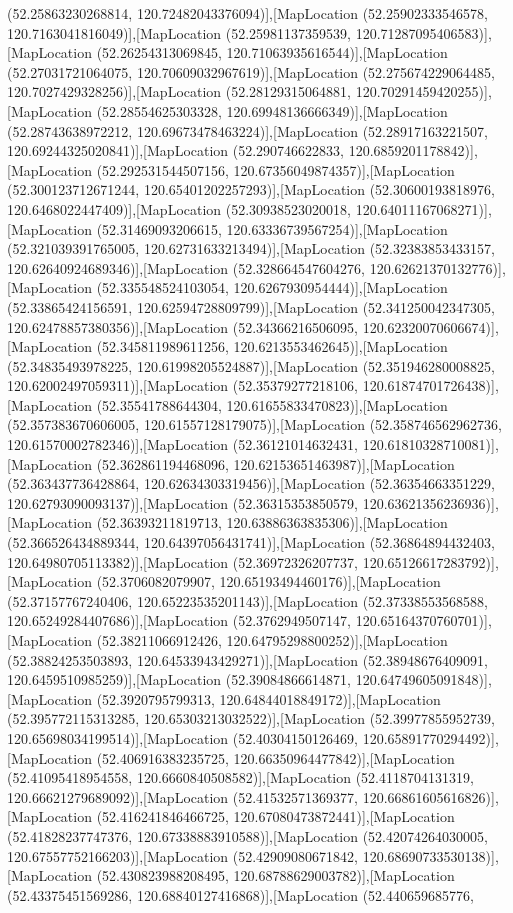(52.25863230268814, 120.72482043376094)],[MapLocation (52.25902333546578, 120.7163041816049)],[MapLocation (52.25981137359539, 120.71287095406583)],[MapLocation (52.26254313069845, 120.71063935616544)],[MapLocation (52.27031721064075, 120.70609032967619)],[MapLocation (52.275674229064485, 120.7027429328256)],[MapLocation (52.28129315064881, 120.70291459420255)],[MapLocation (52.28554625303328, 120.69948136666349)],[MapLocation (52.28743638972212, 120.69673478463224)],[MapLocation (52.28917163221507, 120.69244325020841)],[MapLocation (52.290746622833, 120.6859201178842)],[MapLocation (52.292531544507156, 120.67356049874357)],[MapLocation (52.300123712671244, 120.65401202257293)],[MapLocation (52.30600193818976, 120.6468022447409)],[MapLocation (52.30938523020018, 120.64011167068271)],[MapLocation (52.31469093206615, 120.63336739567254)],[MapLocation (52.321039391765005, 120.62731633213494)],[MapLocation (52.32383853433157, 120.62640924689346)],[MapLocation (52.328664547604276, 120.62621370132776)],[MapLocation (52.335548524103054, 120.6267930954444)],[MapLocation (52.33865424156591, 120.62594728809799)],[MapLocation (52.341250042347305, 120.62478857380356)],[MapLocation (52.34366216506095, 120.62320070606674)],[MapLocation (52.345811989611256, 120.6213553462645)],[MapLocation (52.34835493978225, 120.61998205524887)],[MapLocation (52.351946280008825, 120.62002497059311)],[MapLocation (52.35379277218106, 120.61874701726438)],[MapLocation (52.35541788644304, 120.61655833470823)],[MapLocation (52.357383670606005, 120.61557128179075)],[MapLocation (52.358746562962736, 120.61570002782346)],[MapLocation (52.36121014632431, 120.61810328710081)],[MapLocation (52.362861194468096, 120.62153651463987)],[MapLocation (52.363437736428864, 120.62634303319456)],[MapLocation (52.36354663351229, 120.62793090093137)],[MapLocation (52.36315353850579, 120.63621356236936)],[MapLocation (52.36393211819713, 120.63886363835306)],[MapLocation (52.366526434889344, 120.64397056431741)],[MapLocation (52.36864894432403, 120.64980705113382)],[MapLocation (52.36972326207737, 120.65126617283792)],[MapLocation (52.3706082079907, 120.65193494460176)],[MapLocation (52.37157767240406, 120.65223535201143)],[MapLocation (52.37338553568588, 120.65249284407686)],[MapLocation (52.3762949507147, 120.65164370760701)],[MapLocation (52.38211066912426, 120.64795298800252)],[MapLocation (52.38824253503893, 120.64533943429271)],[MapLocation (52.38948676409091, 120.6459510985259)],[MapLocation (52.39084866614871, 120.64749605091848)],[MapLocation (52.3920795799313, 120.64844018849172)],[MapLocation (52.395772115313285, 120.65303213032522)],[MapLocation (52.39977855952739, 120.65698034199514)],[MapLocation (52.40304150126469, 120.65891770294492)],[MapLocation (52.406916383235725, 120.66350964477842)],[MapLocation (52.41095418954558, 120.6660840508582)],[MapLocation (52.4118704131319, 120.66621279689092)],[MapLocation (52.41532571369377, 120.66861605616826)],[MapLocation (52.416241846466725, 120.67080473872441)],[MapLocation (52.41828237747376, 120.67338883910588)],[MapLocation (52.42074264030005, 120.67557752166203)],[MapLocation (52.42909080671842, 120.68690733530138)],[MapLocation (52.430823988208495, 120.68788629003782)],[MapLocation (52.43375451569286, 120.68840127416868)],[MapLocation (52.440659685776, 